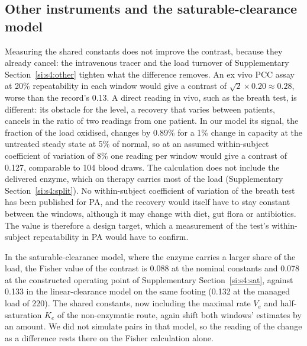 \subsection{Other instruments and the saturable-clearance model}
\label{si:s5:other}

Measuring the shared constants does not improve the contrast, because they already cancel: the
intravenous tracer and the load turnover of Supplementary Section~\ref{si:s4:other} tighten what
the difference removes. An ex vivo PCC assay at 20\% repeatability in each window would give a
contrast of $\sqrt2\times0.20\approx0.28$, worse than the record's 0.13. A direct reading in vivo,
such as the breath test, is different: its obstacle for the level, a recovery that varies between
patients, cancels in the ratio of two readings from one patient. In our model its signal, the
fraction of the load oxidised, changes by 0.89\% for a 1\% change in capacity at the untreated
steady state at 5\% of normal, so at an assumed within-subject coefficient of variation of 8\% one
reading per window would give a contrast of 0.127, comparable to 104 blood draws. The calculation
does not include the delivered enzyme, which on therapy carries most of the load
(Supplementary Section~\ref{si:s4:split}). No within-subject coefficient of variation of
the breath test has been published for PA, and the recovery would itself have to stay constant
between the windows, although it may change with diet, gut flora or antibiotics. The value is
therefore a design target, which a measurement of the test's within-subject repeatability in PA
would have to confirm.

In the saturable-clearance model, where the enzyme carries a larger share of the load, the
Fisher value of the contrast is 0.088 at the nominal constants and 0.078 at the constructed
operating point of Supplementary Section~\ref{si:s4:sat}, against 0.133 in the linear-clearance
model on the same footing (0.132 at the managed load of 220\um). The shared constants, now
including the maximal rate $V_e$ and half-saturation $K_e$ of the non-enzymatic route, again
shift both windows' estimates by an amount. We did not simulate pairs in that model, so the
reading of the change as a difference rests there on the Fisher calculation alone.

